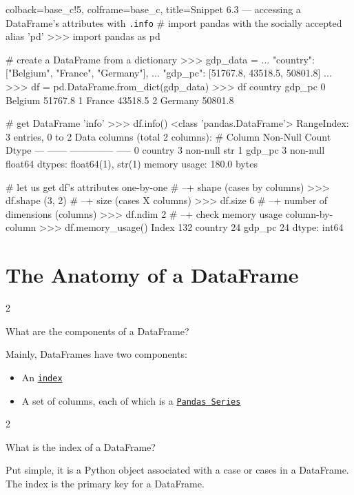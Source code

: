 \documentclass[a4paper,11pt]{book}
\newcommand{\question}[1]{%
    \begin{tcolorbox}[colback=comp_c!10,colframe=comp_c,sidebyside align=top,width=\linewidth,before skip=1ex]
        #1
    \end{tcolorbox}
    \switchcolumn%
}
\newcommand{\note}[1]{%
    \begin{tcolorbox}[colback=white!0,colframe=white!10,width=\linewidth,before skip=1ex]
        #1
    \end{tcolorbox}
}
\begin{document}
\begin{pythoncode}[linenos=true]{colback=base_c!5, colframe=base_c, title=\sffamily Snippet 6.3 --- accessing a DataFrame's attributes with \texttt{.info}}
# import pandas with the socially accepted alias 'pd'
>>> import pandas as pd

# create a DataFrame from a dictionary
>>> gdp_data = {
... 	"country": ["Belgium", "France", "Germany"],
... 	"gdp_pc": [51767.8, 43518.5, 50801.8]
...     }
>>> df = pd.DataFrame.from_dict(gdp_data)
>>> df
   country   gdp_pc
0  Belgium  51767.8
1   France  43518.5
2  Germany  50801.8

# get DataFrame 'info'
>>> df.info()
<class 'pandas.DataFrame'>
RangeIndex: 3 entries, 0 to 2
Data columns (total 2 columns):
 #   Column   Non-Null Count  Dtype  
---  ------   --------------  -----  
 0   country  3 non-null      str    
 1   gdp_pc   3 non-null      float64
dtypes: float64(1), str(1)
memory usage: 180.0 bytes

# let us get df's attributes one-by-one
# --+ shape (cases by columns)
>>> df.shape
(3, 2)
# --+ size (cases X columns)
>>> df.size
6
# --+ number of dimensions (columns)
>>> df.ndim
2
# --+ check memory usage column-by-column
>>> df.memory_usage()
Index      132
country     24
gdp_pc      24
dtype: int64
\end{pythoncode}

\section{The Anatomy of a DataFrame}

\begin{paracol}{2}
	\question{\raggedright What are the components of a DataFrame?}
	\note{Mainly, DataFrames have two components:
	
	\begin{itemize}
		\item An \href{https://pandas.pydata.org/docs/reference/api/pandas.DataFrame.index.html}{\texttt{index}}
		\item A set of columns, each of which is a \href{https://pandas.pydata.org/docs/reference/series.html}{\texttt{Pandas Series}}
	\end{itemize}
	}
\end{paracol}

\begin{paracol}{2}
	\question{\raggedright What is the index of a DataFrame?}
	\note{Put simple, it is a Python object associated with a case or cases in a DataFrame. The index is the primary key for a DataFrame.}
\end{paracol}
\end{document}
